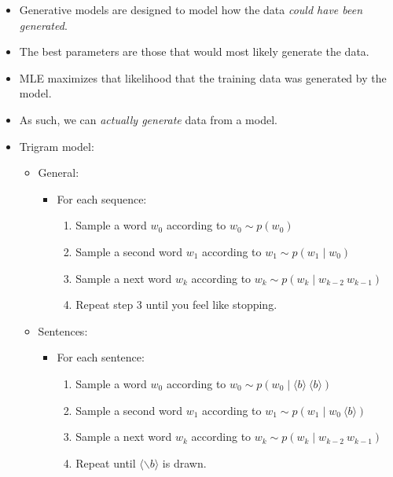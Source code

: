 \documentclass[11pt,letterpaper]{article}
\newcommand{\ngramstart}{\ensuremath{\langle b \rangle}}
\newcommand{\ngramend}{\ensuremath{\langle \backslash b \rangle}}
\begin{document}
\begin{itemize}
  \item Generative models are designed to model how the data \textit{could have been generated}.
  \item The best parameters are those that would most likely generate the data.
  \item MLE maximizes that likelihood that the training data was generated by the model.
  \item As such, we can \textit{actually generate} data from a model.
 
  \item Trigram model:
    \begin{itemize}
      \item General:
        \begin{itemize}
          \item[] \hspace{-4mm} For each sequence:
            \begin{enumerate}
              \item Sample a word $w_0$ according to $w_0 \sim p(w_0)$
              \item Sample a second word $w_1$ according to $w_1 \sim p(w_1 \mid w_0)$
              \item Sample a next word $w_k$ according to $w_k \sim p(w_k \mid w_{k-2}~w_{k-1})$
              \item Repeat step 3 until you feel like stopping.
            \end{enumerate}
        \end{itemize}
      \item Sentences:
        \begin{itemize}
          \item[] \hspace{-4mm} For each sentence:
            \begin{enumerate}
              \item Sample a word $w_0$ according to $w_0 \sim p(w_0 \mid \ngramstart~\ngramstart)$
              \item Sample a second word $w_1$ according to $w_1 \sim p(w_1 \mid w_0~\ngramstart)$
              \item Sample a next word $w_k$ according to $w_k \sim p(w_k \mid w_{k-2}~w_{k-1})$
              \item Repeat until $\ngramend$ is drawn.
            \end{enumerate}
        \end{itemize}
    \end{itemize}


\end{itemize}
\end{document}
